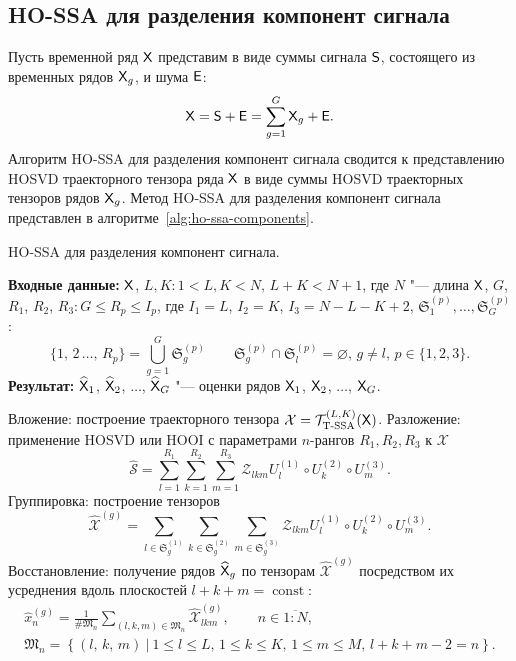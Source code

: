 \documentclass[specialist,
  substylefile=spbu_report.rtx,
subf,href,colorlinks=true, 12pt]{disser}
\theoremstyle{plain}
\theoremstyle{definition}
\theoremstyle{remark}
\newcommand{\Input}{\textbf{Входные данные: }}
\newcommand{\Output}{\textbf{Результат: }}
\begin{document}
\subsection{HO-SSA для разделения компонент сигнала}\label{ho-ssa-sep}
Пусть временной ряд $\mathsf{X}$ представим в виде суммы сигнала $\mathsf{S}$, состоящего
из временных рядов $\mathsf{X}_g$, и шума $\mathsf{E}$:
\[
  \mathsf{X} = \mathsf{S} + \mathsf{E} = \sum_{g=1}^{G} \mathsf{X}_g + \mathsf{E}.
\]
Алгоритм HO-SSA для разделения компонент сигнала сводится к
представлению \linebreak HOSVD траекторного тензора ряда
$\mathsf{X}$ в виде суммы HOSVD траекторных тензоров рядов $\mathsf{X}_g$.
Метод HO-SSA для разделения компонент сигнала представлен в
алгоритме~\ref{alg:ho-ssa-components}.
\begin{algorithm}[!ht]
  \caption{HO-SSA для разделения компонент сигнала.}
  \label{alg:ho-ssa-components}
  \Input $\mathsf{X}$, $L,K: 1< L,K < N,\, L + K < N + 1$, где $N$ "--- длина $\mathsf{X}$,
  $G$, \linebreak $R_1$, $R_2$, $R_3: G \leqslant R_p\leqslant
  I_p$, где $I_1 = L$, $I_2 = K$, $I_3 = N - L - K + 2$,
  $\mathfrak{S}_1^{(p)}, \ldots, \mathfrak{S}_G^{(p)}$:
  \[
    \{1,\, 2\,\ldots,\, R_p\}=\bigcup_{g=1}^{G}\mathfrak{S}_g^{(p)} \qquad
    \mathfrak{S}_g^{(p)}\cap \mathfrak{S}_l^{(p)} =\varnothing,\,
    g\ne l,\, p \in \{1, 2, 3\}.
  \]
  \Output $\widehat{\mathsf{X}}_1$, $\widehat{\mathsf{X}}_2$, $\ldots$,
  $\widehat{\mathsf{X}}_G$ "--- оценки рядов
  $\mathsf{X}_1$, $\mathsf{X}_2$, $\ldots$, $\mathsf{X}_G$.
  \begin{algorithmic}[1]
    \State \label{algstep:ho-ssa-inj}
    Вложение: построение траекторного тензора $\mathcal{X}
    =\mathcal{T}_{\textrm{T-SSA}}^{(L, K)} (\mathsf{X})$.
    \State \label{algstep:ho-ssa-decomp}
    Разложение: применение HOSVD или HOOI с параметрами $n$-рангов
    $R_1, R_2, R_3$ к $\mathcal{X}$
    \begin{equation}
      \widehat{\mathcal{S}}=\sum_{l=1}^{R_1} \sum_{k=1}^{R_2} \sum_{m=1}^{R_3}
      \mathcal{Z}_{lkm} U^{(1)}_{l}
      \circ U^{(2)}_{k} \circ U^{(3)}_{m}.
      \label{eq:trajectory-hosvd}
    \end{equation}
    \State Группировка: построение тензоров
    \begin{equation*}
      \widehat{\mathcal{X}}^{(g)}=\sum_{l \in \mathfrak{S}_g^{(1)}} \sum_{k\in
      \mathfrak{S}_g^{(2)}}
      \sum_{m\in \mathfrak{S}_g^{(3)}}
      \mathcal{Z}_{lkm} U^{(1)}_{l}\circ U^{(2)}_{k} \circ U^{(3)}_{m}.
    \end{equation*}
    \State Восстановление: получение рядов $\widehat{\mathsf{X}}_g$ по тензорам
    $\widehat{\mathcal{X}}^{(g)}$ посредством их усреднения вдоль
    плоскостей $l+k+m=\operatorname{const}$:
    \begin{gather*}
      \hat{x}^{(g)}_n=\frac{1}{\#\mathfrak{M}_n}\sum_{(l,k,m)\in
      \mathfrak{M}_n} \widehat{\mathcal{X}}^{(g)}_{lkm},\qquad n\in
      \overline{1:N},         \\
      \mathfrak{M}_n=\left\{(l,\, k,\, m)~\Big|~1\leqslant l
        \leqslant L,\, 1\leqslant k \leqslant K,\, 1\leqslant m
      \leqslant M,\, l+k+m-2=n\right\}.
    \end{gather*}
  \end{algorithmic}
\end{algorithm}
\end{document}

